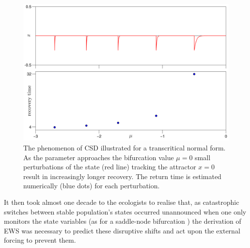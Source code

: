 \documentclass[../main.tex]{subfiles}
\begin{document}
\begin{figure}[H]
    \centering 
    \includegraphics[keepaspectratio, width=\textwidth]{../figures/fig1.2.png}
    \caption{The phenomenon of CSD illustrated for a transcritical normal form. As the parameter approaches the bifurcation value $\mu=0$ small perturbations of the state (red line) tracking the attractor $x=0$ result in increasingly longer recovery. The return time is estimated numerically (blue dots) for each perturbation.}
    \label{fig1.2}
\end{figure}
It then took almost one decade to the ecologists to realise that, as catastrophic switches between stable population's states occurred unannounced when one only monitors the state variables (as for a saddle-node bifurcation \cite{Scheffer01}) the derivation of EWS was necessary to predict these disruptive shifts and act upon the external forcing to prevent them. 
\end{document}
